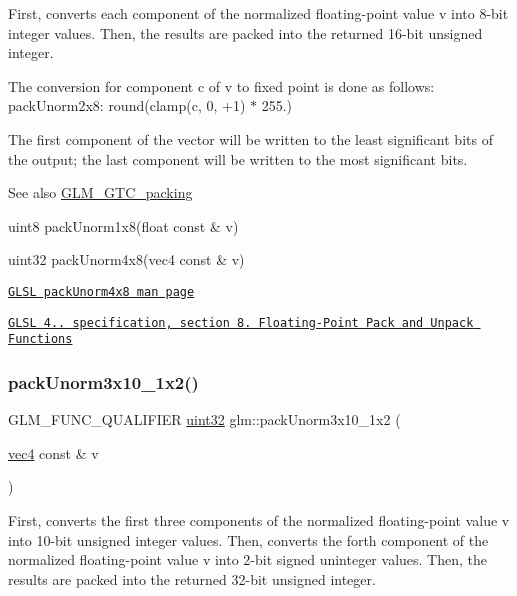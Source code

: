 First, converts each component of the normalized floating-\/point value v into 8-\/bit integer values. Then, the results are packed into the returned 16-\/bit unsigned integer.

The conversion for component c of v to fixed point is done as follows\+: pack\+Unorm2x8\+: round(clamp(c, 0, +1) $\ast$ 255.)

The first component of the vector will be written to the least significant bits of the output; the last component will be written to the most significant bits.

\begin{DoxySeeAlso}{See also}
\hyperlink{group__gtc__packing}{G\+L\+M\+\_\+\+G\+T\+C\+\_\+packing} 

uint8 pack\+Unorm1x8(float const \& v) 

uint32 pack\+Unorm4x8(vec4 const \& v) 

\href{http://www.opengl.org/sdk/docs/manglsl/xhtml/packUnorm4x8.xml}{\tt G\+L\+SL pack\+Unorm4x8 man page} 

\href{http://www.opengl.org/registry/doc/GLSLangSpec.4.20.8.pdf}{\tt G\+L\+SL 4.. specification, section 8. Floating-\/\+Point Pack and Unpack Functions} 
\end{DoxySeeAlso}
\mbox{\label{group__gtc__packing_ga2cf2d11b40bd48639110456fd74c2e33}} 
\subsubsection{\texorpdfstring{pack\+Unorm3x10\+\_\+1x2()}{packUnorm3x10\_1x2()}}
{\footnotesize\ttfamily G\+L\+M\+\_\+\+F\+U\+N\+C\+\_\+\+Q\+U\+A\+L\+I\+F\+I\+ER \hyperlink{group__gtc__type__precision_ga202b6a53c105fcb7e531f9b443518451}{uint32} glm\+::pack\+Unorm3x10\+\_\+1x2 (\begin{DoxyParamCaption}\item[{\hyperlink{group__core__types_ga5881b1b022d7fd1b7218f5916532dd02}{vec4} const \&}]{v }\end{DoxyParamCaption})}

First, converts the first three components of the normalized floating-\/point value v into 10-\/bit unsigned integer values. Then, converts the forth component of the normalized floating-\/point value v into 2-\/bit signed uninteger values. Then, the results are packed into the returned 32-\/bit unsigned integer.

